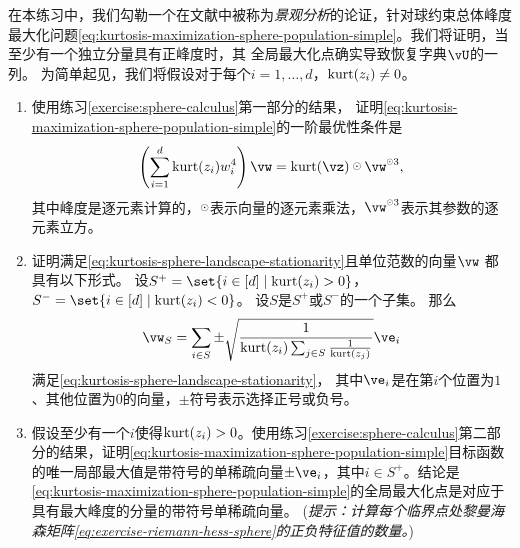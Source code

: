 \documentclass[../../book-main.tex]{subfiles}
\begin{document}
\begin{exercise}\label{exercise:kurtosis-sphere-landscape}
    在本练习中，我们勾勒一个在文献中被称为\textit{景观分析}的论证，针对球约束总体峰度最大化问题\eqref{eq:kurtosis-maximization-sphere-population-simple}。我们将证明，当至少有一个独立分量具有正峰度时，其
    全局最大化点确实导致恢复字典$\vU$的一列。
    为简单起见，我们将假设对于每个$i = 1, \dots, d$，$\mathop{\mathrm{kurt}}(z_i) \neq 0$。
    \begin{enumerate}
        \item 使用练习\ref{exercise:sphere-calculus}第一部分的结果，
        证明\eqref{eq:kurtosis-maximization-sphere-population-simple}的一阶最优性条件是
        \begin{equation}\label{eq:kurtosis-sphere-landscape-stationarity}
            \left(\sum_{i=1}^d \kurt(z_i) w_i^4 \right) 
            \vw = \kurt(\vz) \hada \vw^{\hada 3}, 
        \end{equation}
        其中峰度是逐元素计算的，$\hada$表示向量的逐元素乘法，$\vw^{\hada 3}$表示其参数的逐元素立方。
        \item 证明满足\eqref{eq:kurtosis-sphere-landscape-stationarity}且单位范数的向量$\vw$
        都具有以下形式。
        设$S^+ = \set{i \in [d] \given \kurt(z_i) > 0}$，
        $S^- = \set{i \in [d] \given \kurt(z_i) < 0}$。
        设$S$是$S^+$或$S^-$的一个子集。
        那么
        \begin{equation}\label{eq:kurtosis-sphere-landscape-cps}
            \vw_S = \sum_{i \in S} \pm \sqrt{\frac{1}{\kurt(z_i) \sum_{j \in S} \frac{1}{\kurt(z_j)}}} \ve_i
        \end{equation}
        满足\eqref{eq:kurtosis-sphere-landscape-stationarity}，
        其中$\ve_i$是在第$i$个位置为$1$、其他位置为$0$的向量，$\pm$符号表示选择正号或负号。
        \item 假设至少有一个$i$使得$\mathop{\mathrm{kurt}}(z_i) > 0$。使用练习\ref{exercise:sphere-calculus}第二部分的结果，证明\eqref{eq:kurtosis-maximization-sphere-population-simple}目标函数的唯一局部最大值是带符号的单稀疏向量$\pm \ve_i$，其中$i \in S^+$。结论是\eqref{eq:kurtosis-maximization-sphere-population-simple}的全局最大化点是对应于具有最大峰度的分量的带符号单稀疏向量。%
        (\textit{提示：计算每个临界点处黎曼海森矩阵\eqref{eq:exercise-riemann-hess-sphere}的正负特征值的数量。})

\end{enumerate}
\end{exercise}
\end{document}
